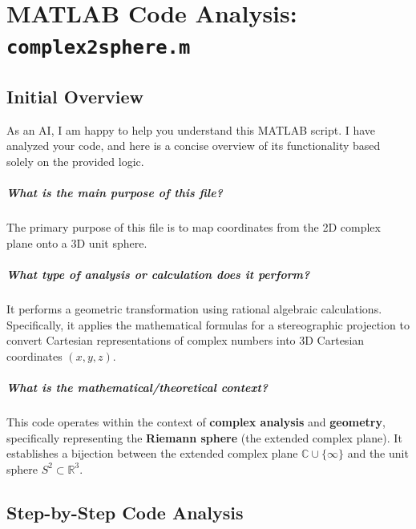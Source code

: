 
\chapter{MATLAB Code Analysis: \texttt{complex2sphere.m}}
\author{}
\date{}


\maketitle

\section{Initial Overview}

As an AI, I am happy to help you understand this MATLAB script. I have analyzed your code, and here is a concise overview of its functionality based solely on the provided logic.

\paragraph{What is the main purpose of this file?}
The primary purpose of this file is to map coordinates from the 2D complex plane onto a 3D unit sphere. 

\paragraph{What type of analysis or calculation does it perform?}
It performs a geometric transformation using rational algebraic calculations. Specifically, it applies the mathematical formulas for a stereographic projection to convert Cartesian representations of complex numbers into 3D Cartesian coordinates $(x, y, z)$.

\paragraph{What is the mathematical/theoretical context?}
This code operates within the context of \textbf{complex analysis} and \textbf{geometry}, specifically representing the \textbf{Riemann sphere} (the extended complex plane). It establishes a bijection between the extended complex plane $\mathbb{C} \cup \{\infty\}$ and the unit sphere $S^2 \subset \mathbb{R}^3$.

\section{Step-by-Step Code Analysis}

